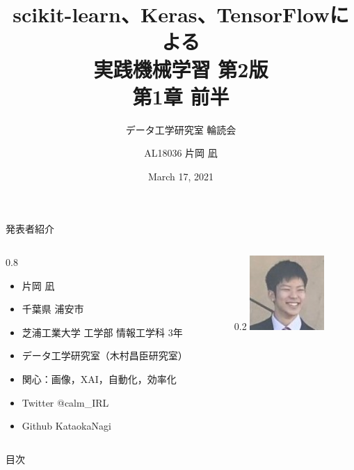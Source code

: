 \documentclass[aspectratio=169, dvipdfmx, 14pt, xcolor={svgnames,dvipsnames}]{beamer}
\title[実践機械学習 輪読会 第1章 前半]{scikit-learn、Keras、TensorFlowによる\\実践機械学習 第2版\\第1章 前半}
\subtitle{データ工学研究室 輪読会}
\author[片岡 凪]{AL18036 片岡 凪}
\institute[データ工学研究室 B3]{芝浦工業大学 工学部 情報工学科 3年}
\date{March 17, 2021}
\newlength{\mytotalwidth}
\newlength{\mycolumnwidth}
\begin{document}

\maketitle


\begin{frame}{\quad 発表者紹介}
  \begin{columns}[totalwidth=\mytotalwidth]
    \begin{column}[t]{0.8\mycolumnwidth}
      \begin{itemize}
        \item 片岡 凪
        \item 千葉県 浦安市
        \item 芝浦工業大学 工学部 情報工学科 3年
        \item データ工学研究室（木村昌臣研究室）
        \item 関心：画像，XAI，自動化，効率化
        \item Twitter @calm\_IRL
        \item Github  KataokaNagi
      \end{itemize}
    \end{column}
    \begin{column}[T]{0.2\mycolumnwidth}
      \centering
      \includegraphics[width=80pt]{img/icon.jpg}
    \end{column}
  \end{columns}
\end{frame}


\begin{frame}{目次}
  \tableofcontents
\end{frame}

\end{document}
